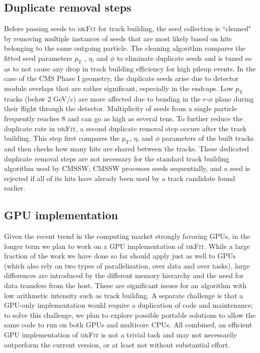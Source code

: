 \documentclass[a4paper,11pt]{article}
\newcommand{\mkFit}{\textsc{mkFit}\xspace}
\begin{document}
\subsection{Duplicate removal steps}
\label{sec:dr}

Before passing seeds to \mkFit for track building, the seed collection is ``cleaned" by removing multiple instances of seeds that are most likely based on hits belonging to the same outgoing particle. The cleaning algorithm compares the fitted seed parameters $p_\mathrm{T}$ , $\eta$, and $\phi$ to eliminate duplicate seeds and is tuned so as to not cause any drop in track building efficiency for high pileup events. In the case of the CMS Phase I geometry, the duplicate seeds arise due to detector module overlaps that are rather significant, especially in the endcaps.
Low $p_\mathrm{T}$ tracks (below 2 GeV/c) are more affected due to bending in the $r$-$\phi$ plane during their flight through the detector. Multiplicity of seeds from a single particle frequently reaches 8 and can go as high as several tens. To further reduce the duplicate rate in \mkFit, a second duplicate removal step occurs after the track building. This step first compares the $p_\mathrm{T}$, $\eta$, and $\phi$ parameters of the built tracks and then checks how many hits are shared between the tracks. These dedicated duplicate removal steps are not necessary for the standard track building algorithm used by CMSSW; CMSSW processes seeds sequentially, and a seed is rejected if all of its hits have already been used by a track candidate found earlier.

\subsection{GPU implementation}

Given the recent trend in the computing market strongly favoring GPUs, in the longer term we plan to work on a GPU implementation of \mkFit. While a large fraction of the work we have done so far should apply just as well to GPUs (which also rely on two types of parallelization, over data and over tasks), large differences are introduced by the different memory hierarchy and the need for data transfers from the host. 
These are significant issues for an algorithm with low arithmetic intensity such as track building.
A separate challenge is that a GPU-only implementation would require a duplication of code and maintenance; to solve this challenge, we plan to explore possible portable solutions to allow the same code to run on both GPUs and multicore CPUs. All combined, an efficient GPU implementation of \mkFit is not a trivial task and may not necessarily outperform the current version, or at least not without substantial effort.
\end{document}
